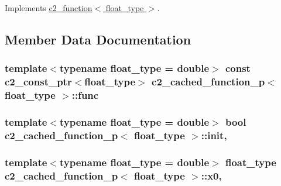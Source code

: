 Implements \hyperlink{classc2__function_a44e0201159111350be7f746fc9026f67}{c2\+\_\+function$<$ float\+\_\+type $>$}.



\subsection{Member Data Documentation}
\subsubsection[{\texorpdfstring{func}{func}}]{\setlength{\rightskip}{0pt plus 5cm}template$<$typename float\+\_\+type  = double$>$ const {\bf c2\+\_\+const\+\_\+ptr}$<$float\+\_\+type$>$ {\bf c2\+\_\+cached\+\_\+function\+\_\+p}$<$ float\+\_\+type $>$\+::func\hspace{0.3cm}{\ttfamily [protected]}}\hypertarget{classc2__cached__function__p_a3918bce2ff2768a71256c5ef9346416e}{}\label{classc2__cached__function__p_a3918bce2ff2768a71256c5ef9346416e}
\subsubsection[{\texorpdfstring{init}{init}}]{\setlength{\rightskip}{0pt plus 5cm}template$<$typename float\+\_\+type  = double$>$ bool {\bf c2\+\_\+cached\+\_\+function\+\_\+p}$<$ float\+\_\+type $>$\+::init\hspace{0.3cm}{\ttfamily [mutable]}, {\ttfamily [protected]}}\hypertarget{classc2__cached__function__p_a67f6484e64960b65ae0f7127d72707ff}{}\label{classc2__cached__function__p_a67f6484e64960b65ae0f7127d72707ff}
\subsubsection[{\texorpdfstring{x0}{x0}}]{\setlength{\rightskip}{0pt plus 5cm}template$<$typename float\+\_\+type  = double$>$ float\+\_\+type {\bf c2\+\_\+cached\+\_\+function\+\_\+p}$<$ float\+\_\+type $>$\+::x0\hspace{0.3cm}{\ttfamily [mutable]}, {\ttfamily [protected]}}\hypertarget{classc2__cached__function__p_a0dac26fccad111242068e3b43e387483}{}\label{classc2__cached__function__p_a0dac26fccad111242068e3b43e387483}
